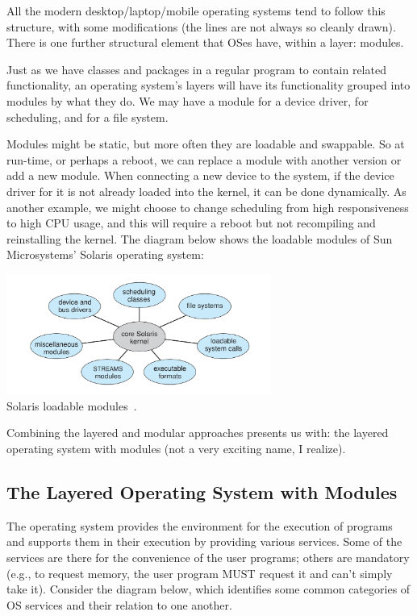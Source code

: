 All the modern desktop/laptop/mobile operating systems tend to follow this structure, with some modifications (the lines are not always so cleanly drawn). There is one further structural element that OSes have, within a layer: modules.

Just as we have classes and packages in a regular program to contain related functionality, an operating system's layers will have its functionality grouped into modules by what they do. We may have a module for a device driver, for scheduling, and for a file system.

Modules might be static, but more often they are loadable and swappable. So at run-time, or perhaps a reboot, we can replace a module with another version or add a new module. When connecting a new device to the system, if the device driver for it is not already loaded into the kernel, it can be done dynamically. As another example, we might choose to change scheduling from high responsiveness to high CPU usage, and this will require a reboot but not recompiling and reinstalling the kernel. The diagram below shows the loadable modules of Sun Microsystems' Solaris operating system:

\begin{center}
\includegraphics[width=0.65\textwidth]{images/solaris-structure.png}\\
Solaris loadable modules~\cite{osc}.
\end{center}

Combining the layered and modular approaches presents us with: the layered operating system with modules (not a very exciting name, I realize).

\subsection*{The Layered Operating System with Modules}

The operating system provides the environment for the execution of programs and supports them in their execution by providing various services. Some of the services are there for the convenience of the user programs; others are mandatory (e.g., to request memory, the user program MUST request it and can't simply take it). Consider the diagram below, which identifies some common categories of OS services and their relation to one another.

